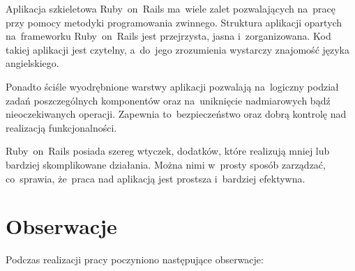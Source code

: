 Aplikacja szkieletowa Ruby~on~Rails ma~wiele zalet pozwalających na~pracę przy pomocy metodyki programowania zwinnego. Struktura aplikacji opartych na~frameworku Ruby~on~Rails jest przejrzysta, jasna i~zorganizowana. Kod takiej aplikacji jest czytelny, a~do~jego zrozumienia wystarczy znajomość języka angielskiego.


Ponadto ściśle wyodrębnione warstwy aplikacji pozwalają na~logiczny podział zadań poszczególnych komponentów oraz na~uniknięcie nadmiarowych bądź nieoczekiwanych operacji. Zapewnia to~bezpieczeństwo oraz dobrą kontrolę nad realizacją funkcjonalności.


Ruby~on~Rails posiada szereg wtyczek, dodatków, które realizują mniej lub bardziej skomplikowane działania. Można nimi w~prosty sposób zarządzać, co~sprawia, że~praca nad aplikacją jest prostsza i~bardziej efektywna.

\section{Obserwacje}

Podczas realizacji pracy poczyniono następujące obserwacje:

